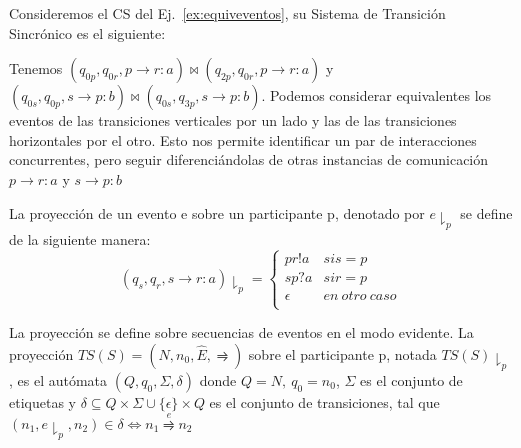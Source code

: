 \begin{ejemplo} 
\label{ex:STS}
Consideremos el CS del Ej.~\ref{ex:equiveventos}, su Sistema de Transición Sincrónico es el siguiente:

\begin{center}
\end{center}

Tenemos $(q_{0p}, q_{0r}, p \rightarrow r:a) \bowtie (q_{2p}, q_{0r}, p \rightarrow r:a)$ y $(q_{0s}, q_{0p}, s \rightarrow p:b) \bowtie (q_{0s}, q_{3p}, s \rightarrow p:b)$. Podemos considerar equivalentes los eventos de las transiciones verticales por un lado y las de las transiciones horizontales por el otro. Esto nos permite identificar un par de interacciones concurrentes, pero seguir diferenciándolas de otras instancias de comunicación $p \rightarrow r:a$ y $s \rightarrow p:b$
\end{ejemplo}

\begin{definition}[Proyecciones] La proyección de un evento e sobre un participante p, denotado por $e \downharpoonright_p$ se define de la siguiente manera:
\begin{equation}
(q_s,q_r,s \rightarrow r:a) \downharpoonright_p = \begin{cases} 
pr!a & \mathit{si} s=p \\
sp?a & \mathit{si} r=p \\
\epsilon & \mathit{en \ otro \ caso} \\
\end{cases} 
\end{equation}

La proyección se define sobre secuencias de eventos en el modo evidente. La proyección $TS(S)= (N, n_0, \hat{E}, \rightrightharpoons)$ sobre el participante p, notada $ TS(S) \downharpoonright_p $, es el autómata $(Q, q_0, \Sigma, \delta)$ donde $Q=N, \ q_0 = n_0$, $\Sigma$ es el conjunto de etiquetas y $\delta \subseteq Q \times \Sigma \cup \{ \epsilon \} \times Q $ es el conjunto de transiciones, tal que $(n_1, e \downharpoonright_p, n_2) \in \delta \iff n_1 \overset{e}{\rightrightharpoons} n_2 $
\end{definition}

